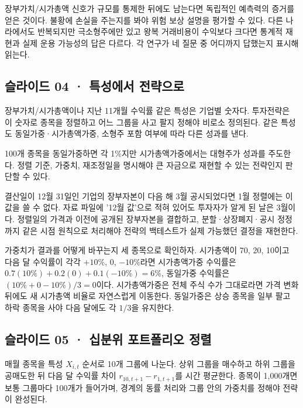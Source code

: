 \documentclass[11pt,a4paper]{article}
\begin{document}
장부가치/시가총액 신호가 규모를 통제한 뒤에도 남는다면 독립적인 예측력의 증거를 얻은 것이다. 불황에 손실을 주는지를 봐야 위험 보상 설명을 평가할 수 있다. 다른 나라에서도 반복되지만 극소형주에만 있고 왕복 거래비용이 수익보다 크다면 통계적 재현과 실제 운용 가능성의 답은 다르다. 각 연구가 네 질문 중 어디까지 답했는지 표시해 읽는다.\par

\subsection{슬라이드 04 · 특성에서 전략으로}
장부가치/시가총액이나 지난 11개월 수익률 같은 특성은 기업별 숫자다. 투자전략은 이 숫자로 종목을 정렬하고 어느 그룹을 사고 팔지 정해야 비로소 정의된다. 같은 특성도 동일가중·시가총액가중, 소형주 포함 여부에 따라 다른 성과를 낸다.\par

100개 종목을 동일가중하면 각 1\%지만 시가총액가중에서는 대형주가 성과를 주도한다. 정렬 기준, 가중치, 재조정일을 명시해야 큰 자금으로 재현할 수 있는 전략인지 판단할 수 있다.\par

결산일이 12월 31일인 기업의 장부자본이 다음 해 3월 공시되었다면 1월 정렬에는 이 값을 쓸 수 없다. 자료 파일에 '12월 값'으로 적혀 있어도 투자자가 알게 된 날은 3월이다. 정렬일의 가격과 이전에 공개된 장부자본을 결합하고, 분할·상장폐지·공시 정정까지 같은 시점 원칙으로 처리해야 전략의 백테스트가 실제 가능했던 결정을 재현한다.\par

가중치가 결과를 어떻게 바꾸는지 세 종목으로 확인하자. 시가총액이 70, 20, 10이고 다음 달 수익률이 각각 $+10\%$, 0, $-10\%$라면 시가총액가중 수익률은 $0.7(10\%)+0.2(0)+0.1(-10\%)=6\%$, 동일가중 수익률은 $(10\%+0-10\%)/3=0$이다. 시가총액가중은 전체 주식 수가 그대로라면 가격 변화 뒤에도 새 시가총액 비율로 자연스럽게 이동한다. 동일가중은 상승 종목을 일부 팔고 하락 종목을 사야 다음 달에도 각 $1/3$을 유지한다.\par

\subsection{슬라이드 05 · 십분위 포트폴리오 정렬}
매월 종목을 특성 $X_{i,t}$ 순서로 10개 그룹에 나눈다. 상위 그룹을 매수하고 하위 그룹을 공매도한 뒤 다음 달 수익률 차이 $r_{10,t+1}-r_{1,t+1}$를 시간 평균한다. 종목이 1,000개면 보통 그룹마다 100개가 들어가며, 경계의 동률 처리와 그룹 안의 가중치를 정해야 전략이 완성된다.\par
\end{document}

